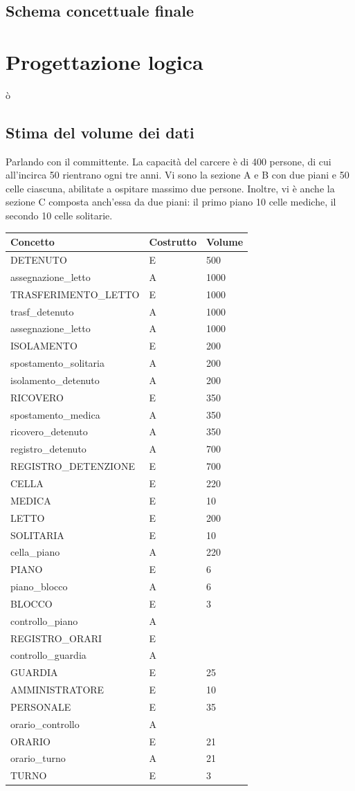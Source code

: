 \documentclass[a4paper,12pt]{report}
\begin{document}
\section{Schema concettuale finale}
\chapter{Progettazione logica}ò
\section{Stima del volume dei dati}
Parlando con il committente.
%
La capacità del carcere è di 400 persone, di cui all'incirca 50 rientrano ogni tre anni.
%
Vi sono la sezione A e B con due piani e 50 celle ciascuna, abilitate a ospitare massimo due persone.
%
Inoltre, vi è anche la sezione C composta anch'essa da due piani: il primo piano 10 celle mediche, il secondo 10 celle solitarie.
%


\begin{table}[H]
\begin{tabular}{lll}
\hline
Concetto & Costrutto & Volume \\ \hline
DETENUTO & E & 500 \\
assegnazione\_letto & A &  1000 \\
TRASFERIMENTO\_LETTO & E &  1000 \\
trasf\_detenuto & A & 1000 \\
assegnazione\_letto & A & 1000 \\
ISOLAMENTO & E & 200\\
spostamento\_solitaria & A & 200\\
isolamento\_detenuto & A & 200 \\
RICOVERO & E & 350 \\
spostamento\_medica & A & 350 \\
ricovero\_detenuto & A & 350 \\
registro\_detenuto & A & 700 \\
REGISTRO\_DETENZIONE & E & 700 \\
CELLA & E & 220 \\
MEDICA & E & 10\\
LETTO & E & 200 \\
SOLITARIA & E & 10 \\
cella\_piano & A & 220 \\
PIANO & E & 6 \\
piano\_blocco & A & 6 \\
BLOCCO & E & 3 \\
controllo\_piano & A & \\
REGISTRO\_ORARI & E & \\
controllo\_guardia & A & \\
GUARDIA & E & 25 \\
AMMINISTRATORE & E & 10 \\
PERSONALE & E & 35 \\
orario\_controllo & A & \\
ORARIO & E & 21 \\
orario\_turno & A & 21 \\
TURNO & E & 3 \\
\end{tabular}
\end{table}
\end{document}
